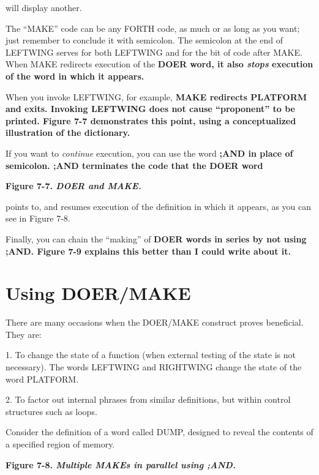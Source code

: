 will display another.

The ``MAKE'' code can be any FORTH code, as much or as long as
you want; just remember to conclude it with semicolon. The semicolon at
the end of LEFTWING serves for both LEFTWING and for the bit of
code after MAKE. When MAKE redirects execution of the \bf{DOER} word,
it also \emph{stops} execution of the word in which it appears.

When you invoke LEFTWING, for example, \bf{MAKE} redirects
PLATFORM and exits. Invoking LEFTWING does not cause ``proponent''
to be printed. Figure 7-7 demonstrates this point, using a
conceptualized illustration of the dictionary.

If you want to \emph{continue} execution, you can use the word \bf{;AND} in
place of semicolon. \bf{;AND} terminates the code that the \bf{DOER} word

\bf{Figure 7-7.} \emph{DOER and MAKE.}


points to, and resumes execution of the definition in which it appears, as
you can see in Figure 7-8.

Finally, you can chain the ``making'' of \bf{DOER} words in series by
not using \bf{;AND}. Figure 7-9 explains this better than I could write about
it.

\section{Using DOER/MAKE}

There are many occasions when the DOER/MAKE construct proves
beneficial. They are:


1. To change the state of a function (when external testing of the state is not
necessary). The words LEFTWING and RIGHTWING change the state of
the word PLATFORM.

2. To factor out internal phrases from similar definitions, but within control
structures such as loops.

Consider the definition of a word called DUMP, designed to reveal the
contents of a specified region of memory.

\bf{Figure 7-8.} \emph{Multiple MAKEs in parallel using ;AND.}


